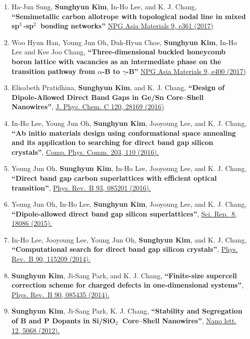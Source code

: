 \begin{enumerate}
{  Reports 7, 7279 (2017)}
\item
  Ha-Jun Sung, \textbf{Sunghyun Kim}, In-Ho Lee, and K. J. Chang,
  \textbf{``Semimetallic carbon allotrope with topological nodal line in
  mixed sp\(^3~\)-sp\(^2~\) bonding networks''}
  \href{http://www.nature.com/am/journal/v9/n3/full/am201726a.html}{NPG
  Asia Materials 9, e361 (2017)}
\item
  Woo Hyun Han, Young Jun Oh, Duk-Hyun Choe, \textbf{Sunghyun Kim},
  In-Ho Lee and Kee Joo Chang, \textbf{``Three-dimensional buckled
  honeycomb boron lattice with vacancies as an intermediate phase on the
  transition pathway from \(\alpha\)-B to \(\gamma\)-B''}
  \href{http://www.nature.com/am/journal/v9/n7/full/am201798a.html}{NPG
  Asia Materials 9, e400 (2017)}
\item
  Elisabeth Pratidhina, \textbf{Sunghyun Kim}, and K. J. Chang,
  \textbf{``Design of Dipole-Allowed Direct Band Gaps in Ge/Sn
  Core--Shell Nanowires''},
  \href{http://pubs.acs.org/doi/abs/10.1021/acs.jpcc.6b08779}{J. Phys.
  Chem. C 120, 28169 (2016)}
\item
  In-Ho Lee, Young Jun Oh, \textbf{Sunghyun Kim}, Jooyoung Lee, and K.
  J. Chang, \textbf{``Ab initio materials design using conformational
  space annealing and its application to searching for direct band gap
  silicon crystals''},
  \href{http://dx.doi.org/10.1016/j.cpc.2016.02.011}{Comp. Phys. Comm.
  203, 110 (2016).}
\item
  Young Jun Oh, \textbf{Sunghyun Kim}, In-Ho Lee, Jooyoung Lee, and K.
  J. Chang, \textbf{``Direct band gap carbon superlattices with
  efficient optical transition''},
  \href{http://journals.aps.org/prb/abstract/10.1103/PhysRevB.93.085201}{Phys.
  Rev.~B 93, 085201 (2016).}
\item
  Young Jun Oh, In-Ho Lee, \textbf{Sunghyun Kim}, Jooyoung Lee, and K.
  J. Chang, \textbf{``Dipole-allowed direct band gap silicon
  superlattices''}, \href{http://dx.doi.org/10.1038/srep18086}{Sci.
  Rep.~8, 18086 (2015).}
\item
  In-Ho Lee, Jooyoung Lee, Young Jun Oh, \textbf{Sunghyun Kim}, and K.
  J. Chang, \textbf{``Computational search for direct band gap silicon
  crystals''},
  \href{http://journals.aps.org/prb/abstract/10.1103/PhysRevB.90.115209}{Phys.
  Rev.~B 90, 115209 (2014).}
\item
  \textbf{Sunghyun Kim}, Ji-Sang Park, and K. J. Chang,
  \textbf{``Finite-size supercell correction scheme for charged defects
  in one-dimensional systems''},
  \href{http://journals.aps.org/prb/abstract/10.1103/PhysRevB.90.085435}{Phys.
  Rev.~B 90, 085435 (2014).}
\item
  \textbf{Sunghyun Kim}, Ji-Sang Park, K. J. Chang, \textbf{``Stability
  and Segregation of B and P Dopants in Si/SiO\(_2~\) Core--Shell
  Nanowires''},
  \href{http://pubs.acs.org/doi/abs/10.1021/nl3013924}{Nano lett. 12,
  5068 (2012).}
\end{enumerate}
